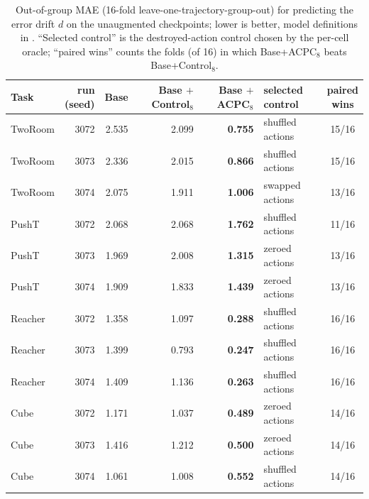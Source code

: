 \begin{table}[t]
\centering
\caption{Out-of-group MAE (16-fold leave-one-trajectory-group-out) for predicting the error drift $d$ on the unaugmented checkpoints; lower is better, model definitions in . ``Selected control'' is the destroyed-action control chosen by the per-cell oracle; ``paired wins'' counts the folds (of 16) in which Base+ACPC$_8$ beats Base+Control$_8$.}
\label{tab:target-aligned-acpc-absolute}
\footnotesize
\setlength{\tabcolsep}{3.2pt}
\begin{tabular}{lrrrrlc}
\toprule
Task & \shortstack{run\\(seed)} & Base & \shortstack{Base\\$+$Control$_8$} & \shortstack{Base\\$+$ACPC$_8$} & \shortstack{selected\\control} & \shortstack{paired\\wins} \\
\midrule
TwoRoom & 3072 & 2.535 & 2.099 & \textbf{0.755} & shuffled actions & 15/16 \\
TwoRoom & 3073 & 2.336 & 2.015 & \textbf{0.866} & shuffled actions & 15/16 \\
TwoRoom & 3074 & 2.075 & 1.911 & \textbf{1.006} & swapped actions & 13/16 \\
\addlinespace[1pt]
PushT & 3072 & 2.068 & 2.068 & \textbf{1.762} & shuffled actions & 11/16 \\
PushT & 3073 & 1.969 & 2.008 & \textbf{1.315} & zeroed actions & 13/16 \\
PushT & 3074 & 1.909 & 1.833 & \textbf{1.439} & zeroed actions & 13/16 \\
\addlinespace[1pt]
Reacher & 3072 & 1.358 & 1.097 & \textbf{0.288} & shuffled actions & 16/16 \\
Reacher & 3073 & 1.399 & 0.793 & \textbf{0.247} & shuffled actions & 16/16 \\
Reacher & 3074 & 1.409 & 1.136 & \textbf{0.263} & shuffled actions & 16/16 \\
\addlinespace[1pt]
Cube & 3072 & 1.171 & 1.037 & \textbf{0.489} & zeroed actions & 14/16 \\
Cube & 3073 & 1.416 & 1.212 & \textbf{0.500} & zeroed actions & 14/16 \\
Cube & 3074 & 1.061 & 1.008 & \textbf{0.552} & shuffled actions & 14/16 \\
\bottomrule
\end{tabular}
\end{table}
